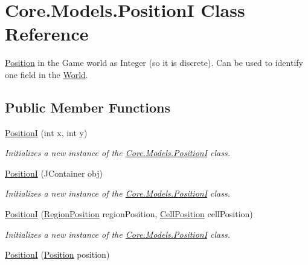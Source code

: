 \hypertarget{classCore_1_1Models_1_1PositionI}{}\section{Core.\+Models.\+Position\+I Class Reference}
\label{classCore_1_1Models_1_1PositionI}


\hyperlink{classCore_1_1Models_1_1Position}{Position} in the Game world as Integer (so it is discrete). Can be used to identify one field in the \hyperlink{classCore_1_1Models_1_1World}{World}.  


\subsection*{Public Member Functions}
\begin{DoxyCompactItemize}
\item 
\hyperlink{classCore_1_1Models_1_1PositionI_a77a350d1cd0431b7640fc50c2d1f1b08}{Position\+I} (int x, int y)
\begin{DoxyCompactList}\small\item\em Initializes a new instance of the \hyperlink{classCore_1_1Models_1_1PositionI}{Core.\+Models.\+Position\+I} class. \end{DoxyCompactList}\item 
\hyperlink{classCore_1_1Models_1_1PositionI_aa96d094d9d0c73b95ed5e3bcc3c7139c}{Position\+I} (J\+Container obj)
\begin{DoxyCompactList}\small\item\em Initializes a new instance of the \hyperlink{classCore_1_1Models_1_1PositionI}{Core.\+Models.\+Position\+I} class. \end{DoxyCompactList}\item 
\hyperlink{classCore_1_1Models_1_1PositionI_a754155c0d79a76caa5175332f7cb87f4}{Position\+I} (\hyperlink{classCore_1_1Models_1_1RegionPosition}{Region\+Position} region\+Position, \hyperlink{classCore_1_1Models_1_1CellPosition}{Cell\+Position} cell\+Position)
\begin{DoxyCompactList}\small\item\em Initializes a new instance of the \hyperlink{classCore_1_1Models_1_1PositionI}{Core.\+Models.\+Position\+I} class. \end{DoxyCompactList}\item 
\hyperlink{classCore_1_1Models_1_1PositionI_a7ae2d0db70f2e9273cfa3a5c9ff24bc7}{Position\+I} (\hyperlink{classCore_1_1Models_1_1Position}{Position} position)

\end{DoxyCompactItemize}
